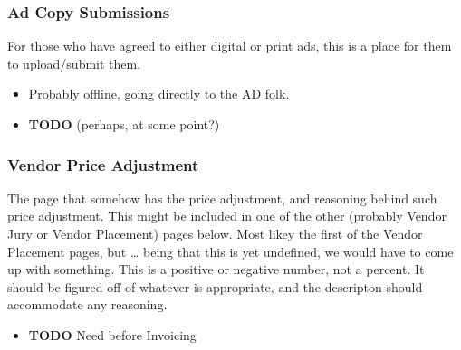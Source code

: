 \documentclass[captions=tablesignature]{scrartcl}
\begin{document}
\subsubsection{Ad Copy Submissions}
\label{sec-3-1-9}
For those who have agreed to either digital or print ads, this is
a place for them to upload/submit them.
\begin{itemize}
\item Probably offline, going directly to the AD folk.
\end{itemize}
\begin{itemize}
\item {\bfseries\sffamily TODO} (perhaps, at some point?)
\label{sec-3-1-9-1}
\end{itemize}

\subsubsection{Vendor Price Adjustment}
\label{sec-3-1-10}
The page that somehow has the price adjustment, and reasoning
behind such price adjustment.
This might be included in one of the other (probably Vendor Jury
or Vendor Placement) pages below.  Most likey the first of the
Vendor Placement pages, but \ldots{} being that this is yet undefined,
we would have to come up with something.
This is a positive or negative number, not a percent.  It should
be figured off of whatever is appropriate, and the descripton
should accommodate any reasoning.
\begin{itemize}
\item {\bfseries\sffamily TODO} Need before Invoicing
\label{sec-3-1-10-1}
\end{itemize}
\end{document}
